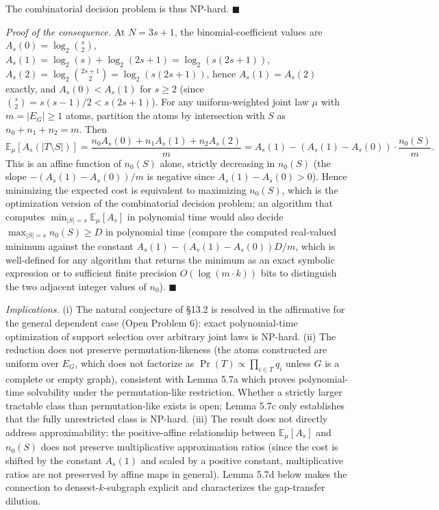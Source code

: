 \documentclass[
]{article}
\begin{document}
The combinatorial decision problem is thus NP-hard.
\hfill$\blacksquare$

\emph{Proof of the consequence.}
At $N = 3s+1$, the binomial-coefficient values are
$A_s(0) = \log_2 \binom{s}{2}$,
$A_s(1) = \log_2(s) + \log_2(2s+1) = \log_2(s(2s+1))$,
$A_s(2) = \log_2 \binom{2s+1}{2} = \log_2(s(2s+1))$,
hence $A_s(1) = A_s(2)$ exactly, and $A_s(0) < A_s(1)$ for $s \geq 2$
(since $\binom{s}{2} = s(s-1)/2 < s(2s+1)$). For any uniform-weighted
joint law $\mu$ with $m = |E_G| \geq 1$ atoms, partition the atoms by
intersection with $S$ as $n_0 + n_1 + n_2 = m$. Then
\[
\mathbb{E}_\mu[A_s(|T \setminus S|)]
= \frac{n_0 A_s(0) + n_1 A_s(1) + n_2 A_s(2)}{m}
= A_s(1) - (A_s(1) - A_s(0)) \cdot \frac{n_0(S)}{m}.
\]
This is an affine function of $n_0(S)$ alone, strictly decreasing in
$n_0(S)$ (the slope $-(A_s(1) - A_s(0))/m$ is negative since
$A_s(1) - A_s(0) > 0$). Hence minimizing the expected cost is
equivalent to maximizing $n_0(S)$, which is the optimization version
of the combinatorial decision problem; an algorithm that computes
$\min_{|S|=s} \mathbb{E}_\mu[A_s]$ in polynomial time would also decide
$\max_{|S|=s} n_0(S) \geq D$ in polynomial time (compare the computed
real-valued minimum against the constant $A_s(1) - (A_s(1) - A_s(0)) D / m$,
which is well-defined for any algorithm that returns the minimum as an
exact symbolic expression or to sufficient finite precision $O(\log(m \cdot k))$
bits to distinguish the two adjacent integer values of $n_0$).
\hfill$\blacksquare$

\emph{Implications.}
(i) The natural conjecture of §13.2 is resolved in the affirmative for
the general dependent case (Open Problem 6): exact polynomial-time
optimization of support selection over arbitrary joint laws is NP-hard.
(ii) The reduction does not preserve permutation-likeness (the atoms
constructed are uniform over $E_G$, which does not factorize as
$\Pr(T) \propto \prod_{i \in T} q_i$ unless $G$ is a complete or empty
graph), consistent with Lemma 5.7a which proves polynomial-time
solvability under the permutation-like restriction. Whether a
strictly larger tractable class than permutation-like exists is
open; Lemma 5.7c only establishes that the fully unrestricted class
is NP-hard.
(iii) The result does not directly address approximability: the
positive-affine relationship between $\mathbb{E}_\mu[A_s]$ and $n_0(S)$
does not preserve multiplicative approximation ratios (since the cost
is shifted by the constant $A_s(1)$ and scaled by a positive constant,
multiplicative ratios are not preserved by affine maps in general).
Lemma 5.7d below makes the connection to densest-$k$-subgraph
explicit and characterizes the gap-transfer dilution.
\end{document}
